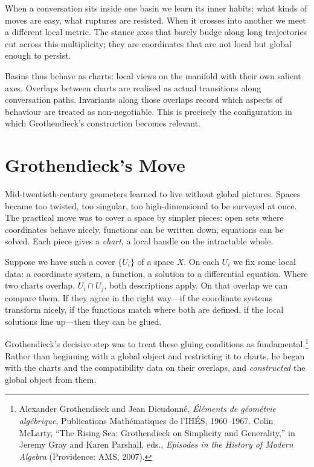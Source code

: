 \documentclass[12pt,a4paper]{article}
\begin{document}
When a conversation sits inside one basin we learn its inner habits: what kinds of moves are easy, what ruptures are resisted. When it crosses into another we meet a different local metric. The stance axes that barely budge along long trajectories cut across this multiplicity; they are coordinates that are not local but global enough to persist.

Basins thus behave as charts: local views on the manifold with their own salient axes. Overlaps between charts are realised as actual transitions along conversation paths. Invariants along those overlaps record which aspects of behaviour are treated as non-negotiable. This is precisely the configuration in which Grothendieck's construction becomes relevant.

\section{Grothendieck's Move}

Mid-twentieth-century geometers learned to live without global pictures. Spaces became too twisted, too singular, too high-dimensional to be surveyed at once. The practical move was to cover a space by simpler pieces: open sets where coordinates behave nicely, functions can be written down, equations can be solved. Each piece gives a \emph{chart}, a local handle on the intractable whole.

Suppose we have such a cover $\{U_i\}$ of a space $X$. On each $U_i$ we fix some local data: a coordinate system, a function, a solution to a differential equation. Where two charts overlap, $U_i \cap U_j$, both descriptions apply. On that overlap we can compare them. If they agree in the right way---if the coordinate systems transform nicely, if the functions match where both are defined, if the local solutions line up---then they can be glued.

Grothendieck's decisive step was to treat these gluing conditions as fundamental.\footnote{Alexander Grothendieck and Jean Dieudonné, \emph{Éléments de géométrie algébrique}, Publications Mathématiques de l'IHÉS, 1960--1967. Colin McLarty, ``The Rising Sea: Grothendieck on Simplicity and Generality,'' in Jeremy Gray and Karen Parshall, eds., \emph{Episodes in the History of Modern Algebra} (Providence: AMS, 2007).} Rather than beginning with a global object and restricting it to charts, he began with the charts and the compatibility data on their overlaps, and \emph{constructed} the global object from them.
\end{document}
